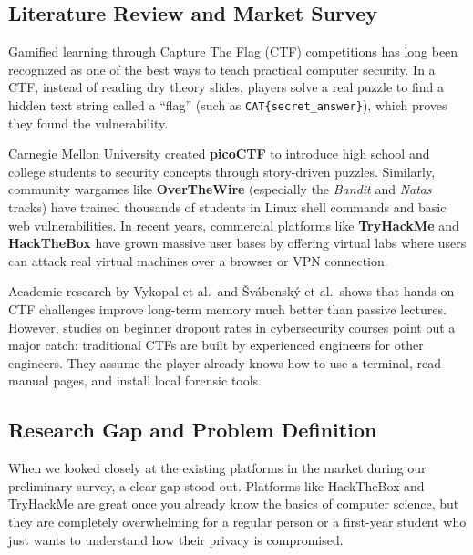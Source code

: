 \documentclass[11pt,a4paper]{article}
\begin{document}
\subsection{Literature Review and Market Survey}
Gamified learning through Capture The Flag (CTF) competitions has long been recognized as one of the best ways to teach practical computer security. In a CTF, instead of reading dry theory slides, players solve a real puzzle to find a hidden text string called a ``flag'' (such as \texttt{CAT\{secret\_answer\}}), which proves they found the vulnerability.

Carnegie Mellon University created \textbf{picoCTF} to introduce high school and college students to security concepts through story-driven puzzles. Similarly, community wargames like \textbf{OverTheWire} (especially the \textit{Bandit} and \textit{Natas} tracks) have trained thousands of students in Linux shell commands and basic web vulnerabilities. In recent years, commercial platforms like \textbf{TryHackMe} and \textbf{HackTheBox} have grown massive user bases by offering virtual labs where users can attack real virtual machines over a browser or VPN connection.

Academic research by Vykopal et al.\ and Švábenský et al.\ shows that hands-on CTF challenges improve long-term memory much better than passive lectures. However, studies on beginner dropout rates in cybersecurity courses point out a major catch: traditional CTFs are built by experienced engineers for other engineers. They assume the player already knows how to use a terminal, read manual pages, and install local forensic tools.

\subsection{Research Gap and Problem Definition}
When we looked closely at the existing platforms in the market during our preliminary survey, a clear gap stood out. Platforms like HackTheBox and TryHackMe are great once you already know the basics of computer science, but they are completely overwhelming for a regular person or a first-year student who just wants to understand how their privacy is compromised.
\end{document}
